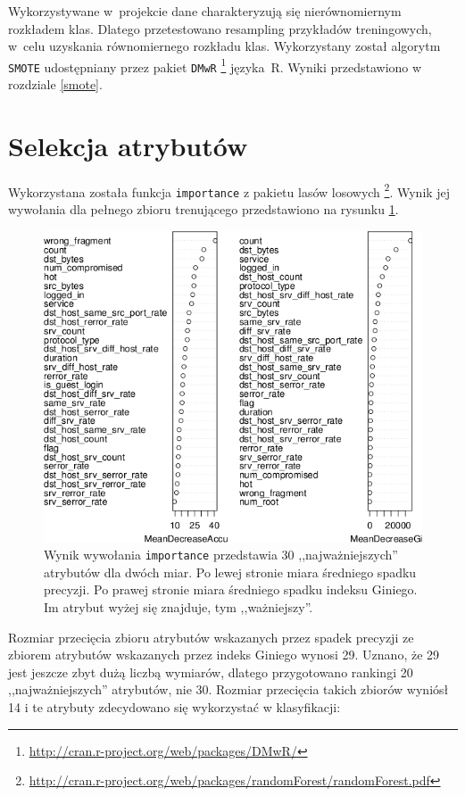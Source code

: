 \documentclass[a4paper, 12pt]{article}
\begin{document}
Wykorzystywane w~projekcie dane charakteryzują się nierównomiernym rozkładem klas. 
Dlatego przetestowano resampling przykładów treningowych, w~celu uzyskania równomiernego rozkładu klas. 
Wykorzystany został algorytm \texttt{SMOTE} udostępniany przez pakiet 
\texttt{DMwR} \footnote{\url{http://cran.r-project.org/web/packages/DMwR/}} języka~R.
Wyniki przedstawiono w rozdziale \ref{smote}.

\section{Selekcja atrybutów}
\label{sec:selekcja}

Wykorzystana została funkcja \texttt{importance} z pakietu lasów losowych
\footnote{\url{http://cran.r-project.org/web/packages/randomForest/randomForest.pdf}}.
Wynik jej wywołania dla pełnego zbioru trenującego przedstawiono na rysunku \ref{fig:attr}.

\begin{figure}[H]
\centering
\includegraphics[width=.9\textwidth]{attr}
\caption{Wynik wywołania \texttt{importance} przedstawia 30 ,,najważniejszych'' atrybutów
dla dwóch miar. 
Po lewej stronie miara średniego spadku precyzji.
Po prawej stronie miara średniego spadku indeksu Giniego. 
Im atrybut wyżej się znajduje, tym ,,ważniejszy''.}
\label{fig:attr}
\end{figure}

Rozmiar przecięcia zbioru atrybutów wskazanych przez spadek precyzji ze zbiorem
atrybutów wskazanych przez indeks Giniego wynosi 29. Uznano, że 29 jest jeszcze zbyt dużą liczbą
wymiarów, dlatego przygotowano rankingi 20 ,,najważniejszych'' atrybutów, nie 30.
Rozmiar przecięcia takich zbiorów wyniósł 14 i te atrybuty zdecydowano się wykorzystać 
w klasyfikacji: \\
\end{document}
